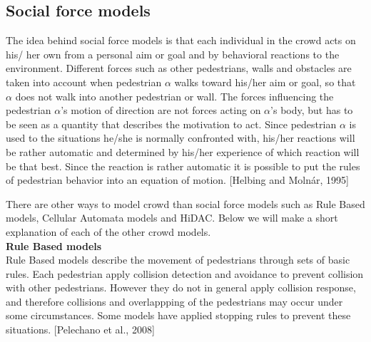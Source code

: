 \subsection{Social force models}


The idea behind social force models is that each individual in the crowd acts 
on his/ her own from a personal aim or goal and by behavioral reactions to the environment. 
Different forces such as other pedestrians, walls and obstacles are taken into account 
when pedestrian $\alpha$ walks toward his/her aim or goal, so that $\alpha$ does not walk 
into another pedestrian or wall. The forces influencing the pedestrian $\alpha$'s motion 
of direction are not forces acting on $\alpha$'s body, but has to be seen as a quantity 
that describes the motivation to act. Since pedestrian $\alpha$ is used to the situations 
he/she is normally confronted with, his/her reactions will be rather automatic and 
determined by his/her experience of which reaction will be that best. Since the reaction 
is rather automatic it is possible to put the rules of pedestrian behavior into an equation 
of motion. [Helbing and Molnár, 1995] %

There are other ways to model crowd than social force models such as Rule Based models, 
Cellular Automata models and HiDAC. Below we will make a short explanation of each of the 
other crowd models.\\


\textbf{Rule Based models}\\
Rule Based models describe the movement of pedestrians through sets of basic rules. Each 
pedestrian apply collision detection and avoidance to prevent collision with other pedestrians. 
However they do not in general apply collision response, and therefore collisions and overlappping 
of the pedestrians may occur under some circumstances. Some models have applied stopping 
rules to prevent these situations. [Pelechano et al., 2008] %

